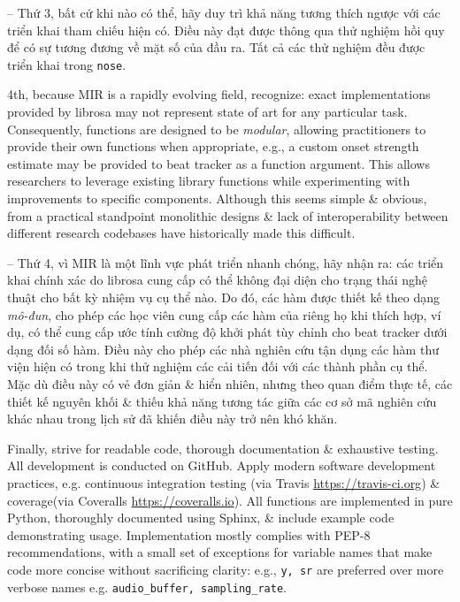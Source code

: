 \documentclass{article}
\begin{document}
\begin{itemize}
\begin{itemize}
		-- Thứ 3, bất cứ khi nào có thể, hãy duy trì khả năng tương thích ngược với các triển khai tham chiếu hiện có. Điều này đạt được thông qua thử nghiệm hồi quy để có sự tương đương về mặt số của đầu ra. Tất cả các thử nghiệm đều được triển khai trong {\tt nose}.
		
		4th, because MIR is a rapidly evolving field, recognize: exact implementations provided by librosa may not represent state of art for any particular task. Consequently, functions are designed to be {\it modular}, allowing practitioners to provide their own functions when appropriate, e.g., a custom onset strength estimate may be provided to beat tracker as a function argument. This allows researchers to leverage existing library functions while experimenting with improvements to specific components. Although this seems simple \& obvious, from a practical standpoint monolithic designs \& lack of interoperability between different research codebases have historically made this difficult.
		
		-- Thứ 4, vì MIR là một lĩnh vực phát triển nhanh chóng, hãy nhận ra: các triển khai chính xác do librosa cung cấp có thể không đại diện cho trạng thái nghệ thuật cho bất kỳ nhiệm vụ cụ thể nào. Do đó, các hàm được thiết kế theo dạng {\it mô-đun}, cho phép các học viên cung cấp các hàm của riêng họ khi thích hợp, ví dụ, có thể cung cấp ước tính cường độ khởi phát tùy chỉnh cho beat tracker dưới dạng đối số hàm. Điều này cho phép các nhà nghiên cứu tận dụng các hàm thư viện hiện có trong khi thử nghiệm các cải tiến đối với các thành phần cụ thể. Mặc dù điều này có vẻ đơn giản \& hiển nhiên, nhưng theo quan điểm thực tế, các thiết kế nguyên khối \& thiếu khả năng tương tác giữa các cơ sở mã nghiên cứu khác nhau trong lịch sử đã khiến điều này trở nên khó khăn.
		
		Finally, strive for readable code, thorough documentation \& exhaustive testing. All development is conducted on GitHub. Apply modern software development practices, e.g. continuous integration testing (via Travis \url{https://travis-ci.org}) \& coverage(via Coveralls \url{https://coveralls.io}). All functions are implemented in pure Python, thoroughly documented using Sphinx, \& include example code demonstrating usage. Implementation mostly complies with PEP-8 recommendations, with a small set of exceptions for variable names that make code more concise without sacrificing clarity: e.g., {\tt y, sr} are preferred over more verbose names e.g. \verb|audio_buffer, sampling_rate|.
		

\end{itemize}
\end{itemize}
\end{document}
